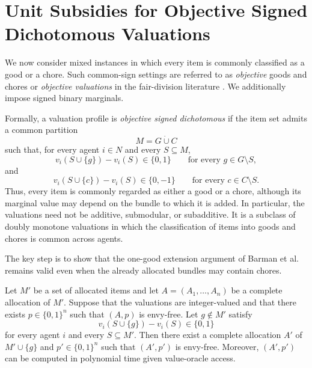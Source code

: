 \section{Unit Subsidies for Objective Signed Dichotomous Valuations}
\label{sec:objective-mixed}

We now consider mixed instances in which every item is commonly classified as a good or a chore. Such common-sign settings are referred to as \emph{objective} goods and chores or \emph{objective valuations} in the fair-division literature \cite{aziz2022fair,bilo2026approximately}. We additionally impose signed binary marginals.

Formally, a valuation profile is \emph{objective signed dichotomous} if the item set admits a common partition
\[
M=G\mathbin{\dot\cup}C
\]such that, for every agent $i\in N$ and every $S\subseteq M$,
\[
v_i(S\cup\{g\})-v_i(S)\in\{0,1\}
\qquad
\text{for every }g\in G\setminus S,
\]
and
\[
v_i(S\cup\{c\})-v_i(S)\in\{0,-1\}
\qquad
\text{for every }c\in C\setminus S.
\]
Thus, every item is commonly regarded as either a good or a chore, although its marginal value may depend on the bundle to which it is added. In particular, the valuations need not be additive, submodular, or subadditive. It is a subclass of doubly monotone valuations in which the classification of items into goods and chores is common across agents.

The key step is to show that the one-good extension argument of Barman et al.~\cite{BKNS22} remains valid even when the already allocated bundles may contain chores.

\begin{lemma}
\label{lem:goods-extension}
Let $M'$ be a set of allocated items and let $A=(A_1,\ldots,A_n)$ be a complete allocation of $M'$. Suppose that the valuations are integer-valued and that there exists $p\in\{0,1\}^n$ such that $(A,p)$ is envy-free. Let $g\notin M'$
satisfy
\[
v_i(S\cup\{g\})-v_i(S)\in\{0,1\}
\]
for every agent $i$ and every $S\subseteq M'$. Then there exist a complete allocation $A'$ of $M'\cup\{g\}$ and $p'\in\{0,1\}^n$ such that $(A',p')$ is envy-free. Moreover, $(A',p')$ can be computed in polynomial time given value-oracle access.
\end{lemma}


